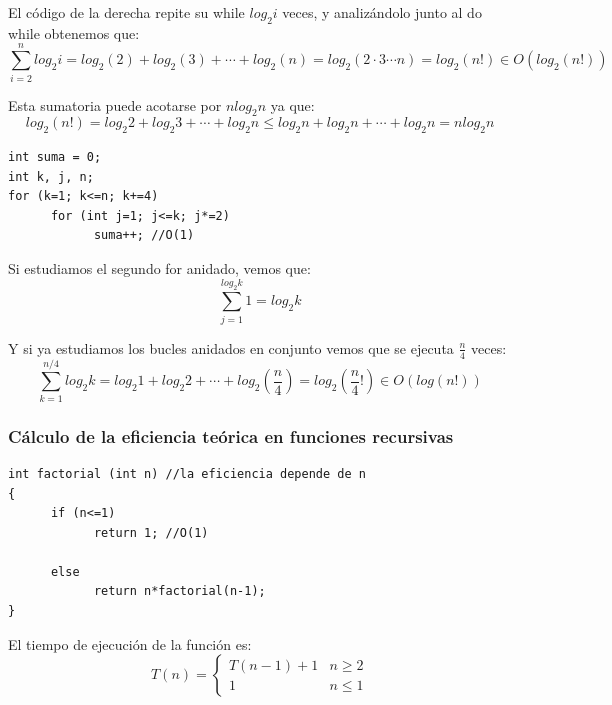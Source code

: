 \documentclass[10pt,a4paper,spanish]{report}
\begin{document}
\noindent
El código de la derecha repite su while $log_{2} i$ veces, y analizándolo junto al do while obtenemos que:
\begin{displaymath}
\sum_{i=2}^{n} log_{2} i = log_{2} (2) + log_{2} (3) + \cdots + log_{2}(n) = log_{2} (2 \cdot 3 \cdots n) = log_{2} (n!) \in O(log_{2}(n!))
\end{displaymath}

\noindent
Esta sumatoria puede acotarse por $nlog_{2} n$ ya que:
\begin{displaymath}
log_{2} (n!) = log_{2} 2 + log_{2} 3 + \cdots + log_{2} n \leq log_{2} n + log_{2} n + \cdots + log_{2} n  = nlog_{2} n
\end{displaymath}

\begin{verbatim}
int suma = 0;
int k, j, n;
for (k=1; k<=n; k+=4)
      for (int j=1; j<=k; j*=2)
            suma++; //O(1)
\end{verbatim}

\noindent
Si estudiamos el segundo for anidado, vemos que:
\begin{displaymath}
\sum_{j=1}^{log_{2}k} 1 = log_{2}k
\end{displaymath}

\noindent
Y si ya estudiamos los bucles anidados en conjunto vemos que se ejecuta $\frac{n}{4}$ veces:
\begin{displaymath}
\sum_{k=1}^{n/4} log_{2}k = log_{2} 1 + log_{2} 2 + \cdots + log_{2} (\frac{n}{4}) = log_{2} (\frac{n}{4}!) \in O(log(n!))
\end{displaymath}

\subsubsection{\textcolor[rgb]{0.1,0.2,0.6}Cálculo de la eficiencia teórica en funciones recursivas}
\noindent
\begin{verbatim}
int factorial (int n) //la eficiencia depende de n
{
      if (n<=1)
            return 1; //O(1)

      else
            return n*factorial(n-1);
}
\end{verbatim}

El tiempo de ejecución de la función es:
\begin{displaymath}
T(n) = \left\{ \begin{array}{ll}
T(n-1)+1  &  n \geq 2\\
1         &  n \leq 1
\end{array} \right.
\end{displaymath}
\end{document}
